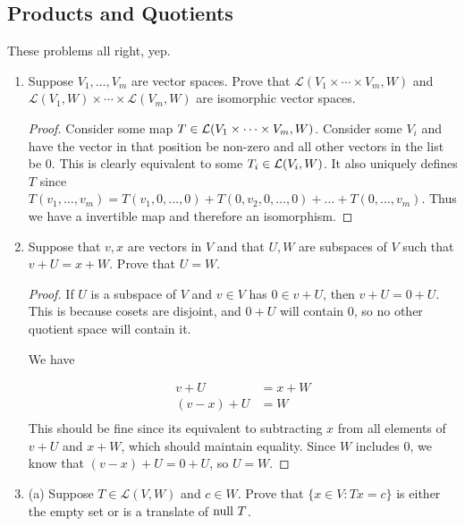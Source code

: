 \subsection{Products and Quotients}

These problems all right, yep.

\begin{enumerate}
    \item[3] Suppose $V_1, \dots, V_m$ are vector spaces. Prove that
    $\mathcal{L}(V_1 \times \cdots \times V_m, W)$ and
    $\mathcal{L}(V_1, W) \times \cdots \times \mathcal{L}(V_m, W)$ are
    isomorphic vector spaces.

    \begin{proof}
        Consider some map $T \in \mathcal L(V_1 \times \dots \times V_m, W)$. Consider some $V_i$ and have the vector in that position be non-zero and all other vectors in the list be 0. This is clearly equivalent to some $T_i \in \mathcal L(V_i, W)$. It also uniquely defines $T$ since $T(v_1, \dots, v_m) = T(v_1, 0, \dots, 0) + T(0, v_2, 0, \dots, 0) + \dots + T(0, \dots, v_m)$. Thus we have a invertible map and therefore an isomorphism.
    \end{proof}

    \item[6] Suppose that $v, x$ are vectors in $V$ and that $U, W$ are subspaces of $V$ such
that $v + U = x + W$. Prove that $U = W$.

    \begin{proof}
        If $U$ is a subspace of $V$ and $v \in V$ has $0 \in v + U$, then $v + U = 0 + U$. This is because cosets are disjoint, and $0 + U$ will contain 0, so no other quotient space will contain it.

        We have 

        \begin{align*}
            v + U &= x + W \\
            (v - x) + U &= W \\
        \end{align*}
        This should be fine since its equivalent to subtracting $x$ from all elements of $v + U$ and $x + W$, which should maintain equality. Since $W$ includes 0, we know that $(v - x) + U = 0 + U$, so $U = W$.


    \end{proof}

    \item[8] (a) Suppose $T \in \mathcal{L}(V, W)$ and $c \in W$. Prove that
    $\{x \in V : Tx = c\}$ is either the empty set or is a translate of
    $\text{null } T$.


\end{enumerate}
